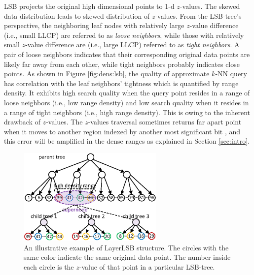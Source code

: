 LSB projects the original high dimensional points to 1-d $z$-values. The skewed data distribution leads to skewed distribution of $z$-values. From the LSB-tree's perspective, the neighboring leaf nodes with relatively large $z$-value difference (i.e., small LLCP) are referred to as \emph{loose neighbors}, while those with relatively small $z$-value difference are (i.e., large LLCP) referred to as \emph{tight neighbors}. A pair of loose neighbors indicates that their corresponding original data points are likely far away from each other, while tight neighbors probably indicates close points. As shown in Figure \ref{fig:dens:lsb}, the quality of approximate $k$-NN query has correlation with the leaf neighbors' tightness which is quantified by range density. It exhibits high search quality when the query point resides in a range of loose neighbors (i.e., low range density) and low search quality when it resides in a range of tight neighbors (i.e., high range density). This is owing to the inherent drawback of $z$-values. The $z$-values traversal sometimes returns far apart point when it moves to another region indexed by another most significant bit \cite{zorkderknn,Zhang:2012:EPK:2247596.2247602}, and this error will be amplified in the dense ranges as explained in Section \ref{sec:intro}.


\begin{figure}[t]
    \centerline{\includegraphics[width=2.8in]{fig/layerlsb.eps}}
    \caption{An illustrative example of LayerLSB structure. The circles with the same color indicate the same original data point. The number inside each circle is the $z$-value of that point in a particular LSB-tree.}
    \label{fig:layerlsb}
\end{figure}

